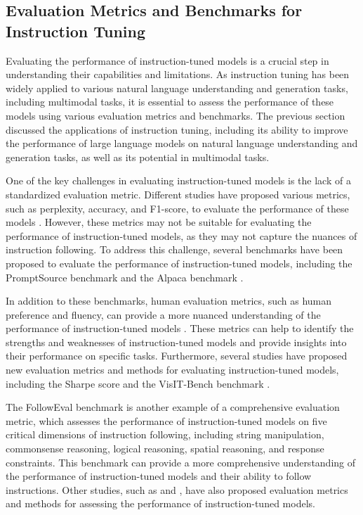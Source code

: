 \documentclass[11pt]{article}
\begin{document}
\subsection{Evaluation Metrics and Benchmarks for Instruction Tuning}

Evaluating the performance of instruction-tuned models is a crucial step in understanding their capabilities and limitations. As instruction tuning has been widely applied to various natural language understanding and generation tasks, including multimodal tasks, it is essential to assess the performance of these models using various evaluation metrics and benchmarks. The previous section discussed the applications of instruction tuning, including its ability to improve the performance of large language models on natural language understanding and generation tasks, as well as its potential in multimodal tasks.

One of the key challenges in evaluating instruction-tuned models is the lack of a standardized evaluation metric. Different studies have proposed various metrics, such as perplexity, accuracy, and F1-score, to evaluate the performance of these models \cite{ref79}. However, these metrics may not be suitable for evaluating the performance of instruction-tuned models, as they may not capture the nuances of instruction following. To address this challenge, several benchmarks have been proposed to evaluate the performance of instruction-tuned models, including the PromptSource benchmark \cite{ref12} and the Alpaca benchmark \cite{ref80}.

In addition to these benchmarks, human evaluation metrics, such as human preference and fluency, can provide a more nuanced understanding of the performance of instruction-tuned models \cite{ref81}. These metrics can help to identify the strengths and weaknesses of instruction-tuned models and provide insights into their performance on specific tasks. Furthermore, several studies have proposed new evaluation metrics and methods for evaluating instruction-tuned models, including the Sharpe score \cite{ref82} and the VisIT-Bench benchmark \cite{ref83}.

The FollowEval benchmark \cite{ref84} is another example of a comprehensive evaluation metric, which assesses the performance of instruction-tuned models on five critical dimensions of instruction following, including string manipulation, commonsense reasoning, logical reasoning, spatial reasoning, and response constraints. This benchmark can provide a more comprehensive understanding of the performance of instruction-tuned models and their ability to follow instructions. Other studies, such as \cite{ref85} and \cite{ref86}, have also proposed evaluation metrics and methods for assessing the performance of instruction-tuned models.
\end{document}
